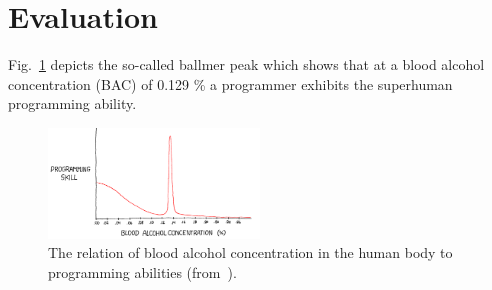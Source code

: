 \section{Evaluation}
Fig.~\ref{fig:ballmer-peak} depicts the so-called ballmer peak which shows
that at a blood alcohol concentration (BAC) of 0.129 \% a programmer exhibits the superhuman programming ability. 
\begin{figure}[htb]
  \centering
  \includegraphics[width=0.5\textwidth]{figures/ballmer-peak}
  \caption[a short description]{The relation of blood alcohol concentration in the human body to programming abilities (from~\cite{xkcd}).}
  \label{fig:ballmer-peak}
\end{figure}


